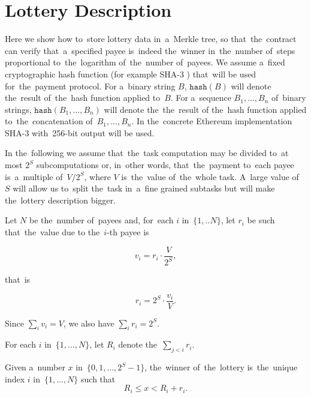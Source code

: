 \documentclass[a4paper]{article}
\newcommand{\hash}[1]{\mathtt{hash}({#1})}
\begin{document}
\section{Lottery Description}
\label{sec:lottery-description}
    Here we show how to~store lottery data in~a~Merkle tree, so that~the~contract can verify that~a~specified payee
    is~indeed the~winner in~the~number of~steps proportional to~the~logarithm of~the~number of~payees.
    We assume a~fixed cryptographic hash function \cite{CRYPTOHANDBOOK} (for example SHA-3 \cite{SHA3})
    that~will be used for~the~payment protocol.
    For a~binary string $B$, $\hash{B}$ will denote the~result of~the~hash function applied to~$B$.
    For a~sequence $B_1, ..., B_n$ of~binary strings, $\hash{B_1, ..., B_n}$ will denote the~the~result of
    the~hash function applied to~the~concatenation of~$B_1, ..., B_n$. In the~concrete Ethereum implementation SHA-3
    with~256-bit output will be used.

    In the~following we assume that~the~task computation may be divided to~at most $2^S$ subcomputations or,
    in~other words, that~the~payment to~each payee is~a~multiple of~$V/2^S$, where $V$ is~the~value of~the~whole task.
    A~large value of~$S$ will allow us to~split the~task in~a~fine grained subtasks but will make the~lottery
    description bigger.

    Let $N$ be the~number of~payees and, for~each $i$ in~$\{1, .. N\}$, let $r_i$ be such that~the~value due to
    the~$i$-th payee is

    \begin{displaymath}
        v_i = r_i \cdot \frac{V}{2^S},
    \end{displaymath}

    that~is

    \begin{displaymath}
        r_i = 2^S \cdot \frac{v_i}{V}.
    \end{displaymath}

    Since $\sum_i v_i = V$, we also have $\sum_i r_i = 2^S$.

    For each $i$ in~$\{1, ..., N\}$, let $R_i$ denote the~$\sum_{j<i} r_i$.

    Given a~number $x$ in~$\{0, 1 ,... ,2^S-1\}$, the~winner of~the~lottery is~the~unique index $i$ in~$\{1, ..., N\}$
    such that
    \begin{displaymath}
        R_i \leq x < R_i+r_i.
    \end{displaymath}
\end{document}
